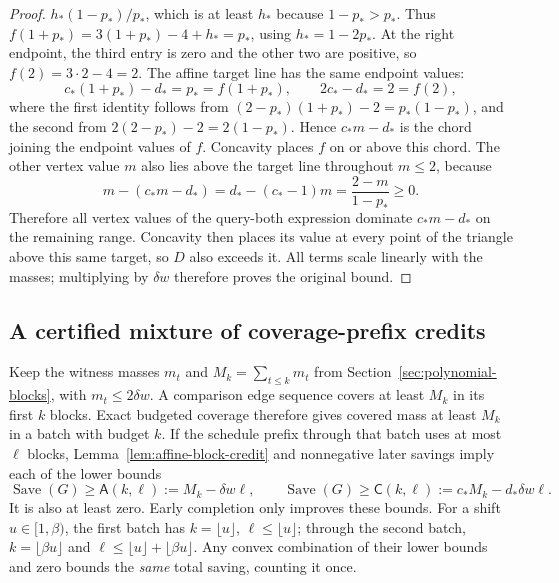 \begin{proof}
$h_*(1-p_*)/p_*$, which is at least $h_*$ because $1-p_*>p_*$.
Thus $f(1+p_*)=3(1+p_*)-4+h_*=p_*$, using $h_*=1-2p_*$. At
the right endpoint, the third entry is zero and the other two are
positive, so $f(2)=3\cdot2-4=2$. The affine target line has the same
endpoint values:
\[
 c_*(1+p_*)-d_*=p_*=f(1+p_*),\qquad
 2c_*-d_*=2=f(2),
\]
where the first identity follows from
$(2-p_*)(1+p_*)-2=p_*(1-p_*)$, and the second from
$2(2-p_*)-2=2(1-p_*)$. Hence $c_*m-d_*$ is the chord joining the
endpoint values of $f$.
Concavity places $f$ on or above this chord. The other
vertex value $m$ also lies above the target line throughout $m\le2$,
because
\[
 m-(c_*m-d_*)=d_*-(c_*-1)m=\frac{2-m}{1-p_*}\ge0.
\]
Therefore all vertex values of the query-both expression dominate
$c_*m-d_*$ on the remaining range. Concavity then places its value at
every point of the triangle above this same target, so $D$ also exceeds
it. All terms scale linearly with the masses; multiplying by
$\delta w$ therefore proves the original bound.
\end{proof}

\subsection{A certified mixture of coverage-prefix credits}

Keep the witness masses $m_t$ and $M_k=\sum_{t\le k}m_t$ from
Section~\ref{sec:polynomial-blocks}, with $m_t\le2\delta w$.
A comparison edge sequence covers at least $M_k$ in its first $k$
blocks. Exact budgeted coverage therefore gives covered mass at least
$M_k$ in a batch with budget $k$. If the schedule prefix through
that batch uses at most $\ell$ blocks, Lemma~\ref{lem:affine-block-credit}
and nonnegative later savings imply each of the lower bounds
\[
 \operatorname{Save}(G)\ge
 \mathsf A(k,\ell):=M_k-\delta w\ell,
 \qquad
 \operatorname{Save}(G)\ge
 \mathsf C(k,\ell):=c_*M_k-d_*\delta w\ell.
\]
It is also at least zero. Early completion only improves these bounds.
For a shift $u\in[1,\beta)$, the first batch has
$k=\lfloor u\rfloor$, $\ell\le\lfloor u\rfloor$; through the
second batch, $k=\lfloor\beta u\rfloor$ and
$\ell\le\lfloor u\rfloor+\lfloor\beta u\rfloor$.
Any convex combination of their lower bounds and zero bounds the
\emph{same} total saving, counting it once.

